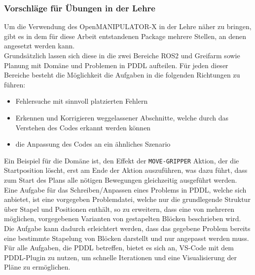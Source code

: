 \subsubsection{Vorschläge für Übungen in der Lehre}
Um die Verwendung des OpenMANIPULATOR-X in der Lehre näher zu bringen, gibt es in dem für diese Arbeit entstandenen Package mehrere Stellen, an denen angesetzt werden kann.\\
Grundsätzlich lassen sich diese in die zwei Bereiche \ac{ROS2} und Greifarm sowie Planung mit Domäne und Problemen in \ac{PDDL} aufteilen.
Für jeden dieser Bereiche besteht die Möglichkeit die Aufgaben in die folgenden Richtungen zu führen:
\begin{itemize}
\item Fehlersuche mit sinnvoll platzierten Fehlern
\item Erkennen und Korrigieren weggelassener Abschnitte, welche durch das Verstehen des Codes erkannt werden können
\item die Anpassung des Codes an ein ähnliches Szenario
\end{itemize}
Ein Beispiel für die Domäne ist, den Effekt der \verb|MOVE-GRIPPER| Aktion, der die Startposition löscht, erst am Ende der Aktion auszuführen, was dazu führt, dass zum Start des Plans alle nötigen Bewegungen gleichzeitig ausgeführt werden.\\
Eine Aufgabe für das Schreiben/Anpassen eines Problems in PDDL, welche sich anbietet, ist eine vorgegeben Problemdatei, welche nur die grundlegende Struktur über Stapel und Positionen enthält, so zu erweitern, dass eine von mehreren möglichen, vorgegebenen Varianten von gestapelten Blöcken beschrieben wird.
Die Aufgabe kann dadurch erleichtert werden, dass das gegebene Problem bereits eine bestimmte Stapelung von Blöcken darstellt und nur angepasst werden muss.\\
Für alle Aufgaben, die \ac{PDDL} betreffen, bietet es sich an, VS-Code mit dem PDDL-Plugin zu nutzen, um schnelle Iterationen und eine Visualisierung der Pläne zu ermöglichen.